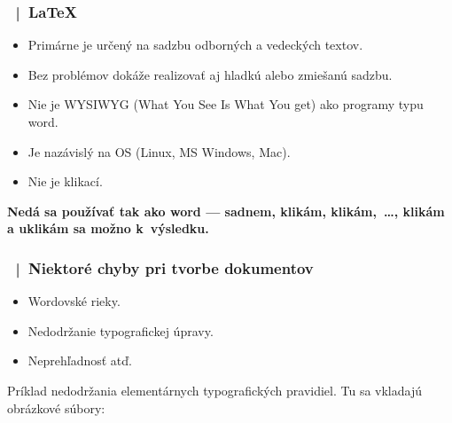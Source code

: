 \documentclass[compress,aspectratio=32]{beamer}
\def\Bmodra{\color{blue!90!black}}
\newcommand\fsectionN[1][|]{\bf{\Large\bf\color{white!80!blue}\sectionN\ #1\ }\color{white!90!black}\large\bf}
\begin{document}
\begin{frame}[t]
\frametitle{\fsectionN \LaTeX}

\begin{itemize}
\item Primárne je určený na sadzbu odborných a vedeckých textov.           
                                                                           
\item Bez problémov dokáže realizovať aj hladkú alebo zmiešanú sadzbu.     
                                                                           
\item Nie je WYSIWYG (What You See Is What You get) ako programy typu word. 
                                                                           
\item Je nazávislý na OS (Linux, MS Windows, Mac).                         
                                                                           
\item Nie je klikací.                                                       

\end{itemize}

{\bf\Bmodra
Nedá sa používať tak ako word --- sadnem, klikám, 
klikám,~\dots, klikám a uklikám sa možno k~výsledku.}

\end{frame}


\begin{frame}[t]
\frametitle{\fsectionN Niektoré chyby pri tvorbe dokumentov}

\begin{itemize}
\item Wordovské rieky.
                                                                           
\item Nedodržanie typografickej úpravy.
                                                                           
\item Neprehľadnosť atď.
                                                                           
\end{itemize}

\smallskip

Príklad nedodržania elementárnych typografických pravidiel.
Tu sa vkladajú obrázkové súbory:

\

\end{frame}
\end{document}
